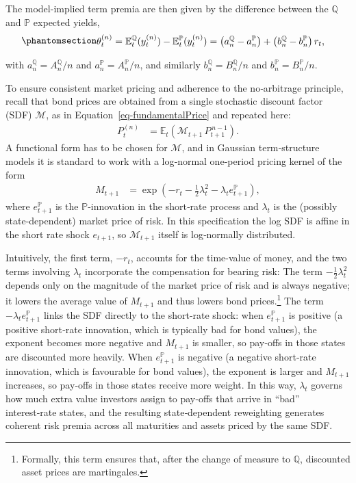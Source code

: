 \documentclass[
  letterpaper,
  DIV=11,
  numbers=noendperiod]{scrreprt}
\begin{document}
The model-implied term premia are then given by the difference between
the \(\mathbb{Q}\) and \(\mathbb{P}\) expected yields,
\begin{equation}\protect\phantomsection\label{eq-TP-def}{
\begin{align}
    \theta_t^{(n)} = \mathbb{E}_t^{\mathbb{Q}}(y_t^{(n)}) - \mathbb{E}_t^{\mathbb{P}}(y_t^{(n)})
    &= \big(a_n^{\mathbb{Q}} - a_n^{\mathbb{P}}\big)
        + \big(b_n^{\mathbb{Q}} - b_n^{\mathbb{P}}\big)\, r_t,
\end{align}
}\end{equation}

with \(a_n^{\mathbb{Q}} = A_n^{\mathbb{Q}}/n\) and
\(a_n^{\mathbb{P}} = A_n^{\mathbb{P}}/n\), and similarly
\(b_n^{\mathbb{Q}} = B_n^{\mathbb{Q}}/n\) and
\(b_n^{\mathbb{P}} = B_n^{\mathbb{P}}/n\).

To ensure consistent market pricing and adherence to the no‑arbitrage
principle, recall that bond prices are obtained from a single stochastic
discount factor (SDF) \(\mathcal{M}\), as in
Equation~\ref{eq-fundamentalPrice} and repeated here:
\begin{align}
    P_t^{(n)} &= \mathbb{E}_t\!\left( \mathcal{M}_{t+1} \, P_{t+1}^{\,n-1} \right). \nonumber
\end{align}
A functional form has to be chosen for \(\mathcal{M}\), and in Gaussian
term‑structure models it is standard to work with a log‑normal
one‑period pricing kernel of the form
\begin{align}
   M_{t+1} &= \exp\left( -r_t - \frac{1}{2}\lambda_t^{2} - \lambda_t e_{t+1}^{\mathbb{P}} \right),
\end{align}
where \(e_{t+1}^{\mathbb{P}}\) is the \(\mathbb{P}\)‑innovation in the
short‑rate process and \(\lambda_t\) is the (possibly state‑dependent)
market price of risk. In this specification the log SDF is affine in the
short rate shock \(e_{t+1}\), so \(\mathcal{M}_{t+1}\) itself is
log‑normally distributed.

Intuitively, the first term, \(-r_t\), accounts for the time-value of
money, and the two terms involving \(\lambda_t\) incorporate the
compensation for bearing risk: The term \(-\tfrac{1}{2}\lambda_t^2\)
depends only on the magnitude of the market price of risk and is always
negative; it lowers the average value of \(M_{t+1}\) and thus lowers
bond prices.\footnote{Formally, this term ensures that, after the change
  of measure to \(\mathbb{Q}\), discounted asset prices are martingales.}
The term \(-\lambda_t e_{t+1}^{\mathbb{P}}\) links the SDF directly to
the short‑rate shock: when \(e_{t+1}^{\mathbb{P}}\) is positive (a
positive short‑rate innovation, which is typically bad for bond values),
the exponent becomes more negative and \(M_{t+1}\) is smaller, so
pay‑offs in those states are discounted more heavily. When
\(e_{t+1}^{\mathbb{P}}\) is negative (a negative short‑rate innovation,
which is favourable for bond values), the exponent is larger and
\(M_{t+1}\) increases, so pay‑offs in those states receive more weight.
In this way, \(\lambda_t\) governs how much extra value investors assign
to pay‑offs that arrive in ``bad'' interest‑rate states, and the
resulting state‑dependent reweighting generates coherent risk premia
across all maturities and assets priced by the same SDF.
\end{document}
